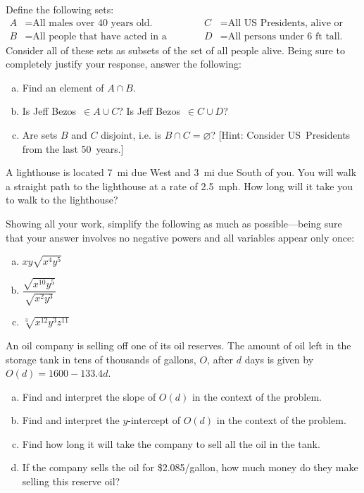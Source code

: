 \documentclass[11pt,letterpaper]{article}
\begin{document}
Define the following sets:
	\[
	\begin{aligned}
	A&= \text{All males over 40~years old.} & & & C&= \text{All US Presidents, alive or dead.} \\
	B&= \text{All people that have acted in a movie.} & & & D&= \text{All persons under 6~ft tall.} 
	\end{aligned}
	\]
Consider all of these sets as subsets of the set of all people alive. Being sure to completely justify your response, answer the following:
	\begin{enumerate}[(a)]
	\item Find an element of $A \cap B$. 
	\item Is Jeff Bezos~$\in A \cup C$? Is Jeff Bezos~$\in C \cup D$?
	\item Are sets $B$ and $C$ disjoint, i.e. is $B \cap C= \varnothing$? [Hint: Consider US~Presidents from the last 50~years.]
	\end{enumerate} \pspace


\prob A lighthouse is located 7~mi due West and 3~mi due South of you. You will walk a straight path to the lighthouse at a rate of 2.5~mph. How long will it take you to walk to the lighthouse? \pspace


\prob Showing all your work, simplify the following as much as possible---being sure that your answer involves no negative powers and all variables appear only once:
	\begin{enumerate}[(a)]
	\item $xy \sqrt{x^4 y^5}$
	\item $\dfrac{\sqrt{x^{10} y^5}}{\sqrt{x^2 y^3}}$
	\item $\sqrt[3]{x^{12} y^3 z^{11}}$
	\end{enumerate} \pspace


\prob An oil company is selling off one of its oil reserves. The amount of oil left in the storage tank in tens of thousands of gallons, $O$, after $d$ days is given by $O(d)= 1600 - 133.4d$.
	\begin{enumerate}[(a)]
	\item Find and interpret the slope of $O(d)$ in the context of the problem.
	\item Find and interpret the $y$-intercept of $O(d)$ in the context of the problem.
	\item Find how long it will take the company to sell all the oil in the tank. 
	\item If the company sells the oil for \$2.085/gallon, how much money do they make selling this reserve oil?
	\end{enumerate} \pspace
\end{document}

